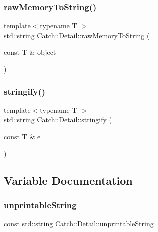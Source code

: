 \subsubsection{\texorpdfstring{raw\+Memory\+To\+String()}{rawMemoryToString()}\hspace{0.1cm}{\footnotesize\ttfamily [2/2]}}
{\footnotesize\ttfamily template$<$typename T $>$ \\
std\+::string Catch\+::\+Detail\+::raw\+Memory\+To\+String (\begin{DoxyParamCaption}\item[{const T \&}]{object }\end{DoxyParamCaption})}

\mbox{\label{namespaceCatch_1_1Detail_af0ad48344ffd3f92f3568465248a9880}} 
\subsubsection{\texorpdfstring{stringify()}{stringify()}}
{\footnotesize\ttfamily template$<$typename T $>$ \\
std\+::string Catch\+::\+Detail\+::stringify (\begin{DoxyParamCaption}\item[{const T \&}]{e }\end{DoxyParamCaption})}



\subsection{Variable Documentation}
\mbox{\label{namespaceCatch_1_1Detail_a466775f4eec29ffef29ab334cd885136}} 
\subsubsection{\texorpdfstring{unprintable\+String}{unprintableString}}
{\footnotesize\ttfamily const std\+::string Catch\+::\+Detail\+::unprintable\+String}

